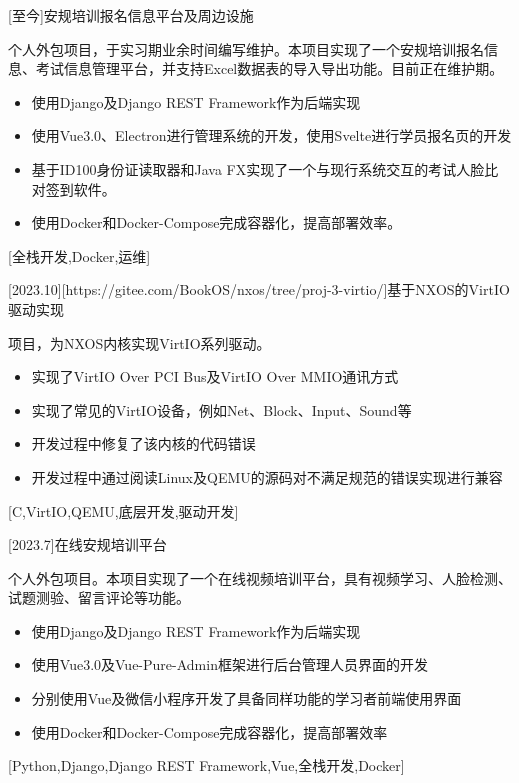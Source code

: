 \documentclass[zh]{resume}
\begin{document}
\begin {projects}
	[至今]{安规培训报名信息平台及周边设施}{
		个人外包项目，于实习期业余时间编写维护。本项目实现了一个安规培训报名信息、考试信息管理平台，并支持Excel数据表的导入导出功能。目前正在维护期。
		\begin{itemize}
			\item 使用Django及Django REST Framework作为后端实现
			\item 使用Vue3.0、Electron进行管理系统的开发，使用Svelte进行学员报名页的开发
			\item 基于ID100身份证读取器和Java FX实现了一个与现行系统交互的考试人脸比对签到软件。
			\item 使用Docker和Docker-Compose完成容器化，提高部署效率。
		\end{itemize}
	}[全栈开发,Docker,运维]

	[2023.10][https://gitee.com/BookOS/nxos/tree/proj-3-virtio/]{基于NXOS的VirtIO驱动实现}{
		项目，为NXOS内核实现VirtIO系列驱动。
		\begin{itemize}
			\item 实现了VirtIO Over PCI Bus及VirtIO Over MMIO通讯方式
			\item 实现了常见的VirtIO设备，例如Net、Block、Input、Sound等
			\item 开发过程中修复了该内核的代码错误
			\item 开发过程中通过阅读Linux及QEMU的源码对不满足规范的错误实现进行兼容
		\end{itemize}
	}[C,VirtIO,QEMU,底层开发,驱动开发]

	[2023.7]{在线安规培训平台}{
		个人外包项目。本项目实现了一个在线视频培训平台，具有视频学习、人脸检测、试题测验、留言评论等功能。
		\begin{itemize}
			\item 使用Django及Django REST Framework作为后端实现
			\item 使用Vue3.0及Vue-Pure-Admin框架进行后台管理人员界面的开发
			\item 分别使用Vue及微信小程序开发了具备同样功能的学习者前端使用界面
			\item 使用Docker和Docker-Compose完成容器化，提高部署效率
		\end{itemize}
	}[Python,Django,Django REST Framework,Vue,全栈开发,Docker]


\end{projects}
\end{document}
